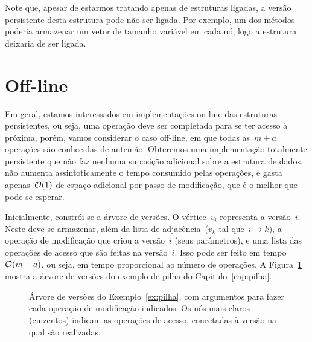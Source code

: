 \documentclass[../../main.tex]{subfiles}
\begin{document}
Note que, apesar de estarmos tratando apenas de estruturas ligadas, a versão persistente desta estrutura pode não ser ligada. Por exemplo, um dos métodos poderia armazenar um vetor de tamanho variável em cada nó, logo a estrutura deixaria de ser ligada.

\section{Off-line}

Em geral, estamos interessados em implementações on-line das estruturas persistentes, ou seja, uma operação deve ser completada para se ter acesso à próxima, porém, vamos considerar o caso off-line, em que todas as~$m+a$ operações são conhecidas de antemão. Obteremos uma implementação totalmente persistente que não faz nenhuma suposição adicional sobre a estrutura de dados, não aumenta assintoticamente o tempo consumido pelas operações, e gasta apenas~$\mathcal{O}(1)$ de espaço adicional por passo de modificação, que é o melhor que pode-se esperar.

Inicialmente, constrói-se a árvore de versões. O vértice~$v_i$ representa a versão~$i$. Neste deve-se armazenar, além da lista de adjacência~($v_k$ tal que~$i \rightarrow k$), a operação de modificação que criou a versão~$i$ (seus parâmetros), e uma lista das operações de acesso que são feitas na versão~$i$. Isso pode ser feito em tempo~$\mathcal{O}(m+a)$, ou seja, em tempo proporcional ao número de operações.
A Figura~\ref{fig:vertree_ex} mostra a árvore de versões do exemplo de pilha do Capítulo~\ref{cap:pilha}.

\begin{figure}
	\centering
	\caption{Árvore de versões do Exemplo~\ref{ex:pilha}, com argumentos para fazer cada operação de modificação indicados. Os nós mais claros (cinzentos) indicam as operações de acesso, conectadas à versão na qual são realizadas.} \label{fig:vertree_ex}
\end{figure}
\end{document}
